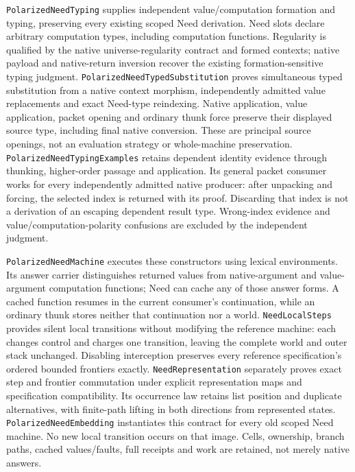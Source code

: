 \documentclass[11pt]{article}
\theoremstyle{definition}
\theoremstyle{remark}
\begin{document}
\nolinkurl{PolarizedNeedTyping} supplies independent value/computation
formation and typing, preserving every existing scoped Need derivation.
Need slots declare arbitrary computation types, including computation
functions. Regularity is qualified by the native universe-regularity
contract and formed contexts; native payload and native-return inversion
recover the existing formation-sensitive typing judgment.
\nolinkurl{PolarizedNeedTypedSubstitution} proves simultaneous typed
substitution from a native context morphism, independently admitted value
replacements and exact Need-type reindexing. Native application, value
application, packet opening and ordinary thunk force preserve their displayed
source type, including final native conversion. These are principal source
openings, not an evaluation strategy or whole-machine preservation.
\nolinkurl{PolarizedNeedTypingExamples} retains dependent identity evidence
through thunking, higher-order passage and application. Its general packet
consumer works for every independently admitted native producer: after
unpacking and forcing, the selected index is returned with its proof.
Discarding that index is not a derivation of an escaping dependent result
type. Wrong-index evidence and value/computation-polarity confusions are
excluded by the independent judgment.

\nolinkurl{PolarizedNeedMachine} executes these constructors using lexical
environments. Its answer carrier distinguishes returned values from
native-argument and value-argument computation functions; Need can cache any
of those answer forms. A cached function resumes in the current consumer's
continuation, while an ordinary thunk stores neither that continuation nor
a world. \nolinkurl{NeedLocalSteps} provides silent local transitions
without modifying the reference machine: each changes control and charges
one transition, leaving the complete world and outer stack unchanged.
Disabling interception preserves every reference specification's ordered
bounded frontiers exactly. \nolinkurl{NeedRepresentation} separately
proves exact step and frontier commutation under explicit representation
maps and specification compatibility. Its occurrence law retains list
position and duplicate alternatives, with finite-path lifting in both
directions from represented states. \nolinkurl{PolarizedNeedEmbedding}
instantiates this contract for every old scoped Need machine. No new local
transition occurs on that image. Cells, ownership, branch paths, cached
values/faults, full receipts and work are retained, not merely native answers.
\end{document}
